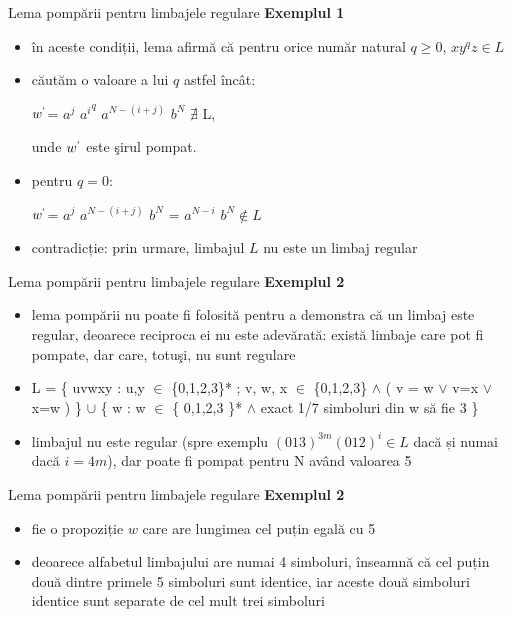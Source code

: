 \documentclass[pdf]{beamer}
\begin{document}
\begin{frame}{Lema pompării pentru limbajele regulare}
\textbf{Exemplul 1}
\begin{itemize}
\item
în aceste condiții, lema afirmă că pentru orice număr natural $q \ge 0$, $x y^q z \in L$
\item
căutăm o valoare a lui $q$ astfel încât: 

$w^{`}$= $a^{j}$ ${a^{i}}^{q}$ $a^{N-(i+j)}$ $b^{N}$ $\nexists$ L, 

unde  $w^{`}$ este şirul pompat. 
\item
pentru $q=0$: 

$w^{`}$= $a^{j}$ $a^{N-(i+j)}$ $b^{N}$ = $a^{N-i}$ $b^{N} \notin L$
\item
contradicție: prin urmare, limbajul $L$ nu este un limbaj regular
\end{itemize}
\end{frame}



\begin{frame}{Lema pompării pentru limbajele regulare}
\textbf{Exemplul 2}
\begin{itemize}
\item
lema pompării nu poate fi folosită pentru a demonstra că un limbaj este regular, deoarece reciproca ei nu este adevărată: există limbaje care pot fi pompate, dar care, totuşi, nu sunt regulare
\item
L = \{ uvwxy : u,y $\in$ \{0,1,2,3\}* ; v, w, x $\in$ \{0,1,2,3\} $\wedge$ ( v = w $\vee$ v=x $\vee$ x=w ) \} $\cup$ \{ w : w $\in$ \{ 0,1,2,3 \}* $\wedge$  exact 1/7 simboluri din w să fie 3 \}
\item
limbajul nu este regular (spre exemplu $(013)^{3m}(012)^{i} \in L$ dacă și numai dacă $i=4m$), dar poate fi pompat pentru N având valoarea 5
\end{itemize}
\end{frame}



\begin{frame}{Lema pompării pentru limbajele regulare}
\textbf{Exemplul 2}
\begin{itemize}
\item
fie o propoziție $w$ care are lungimea cel puțin egală cu 5
\item
deoarece alfabetul limbajului are numai 4 simboluri, înseamnă că cel puțin două dintre primele 5 simboluri sunt identice, iar aceste două simboluri identice sunt separate de cel mult trei simboluri
\end{itemize}
\end{frame}
\end{document}
